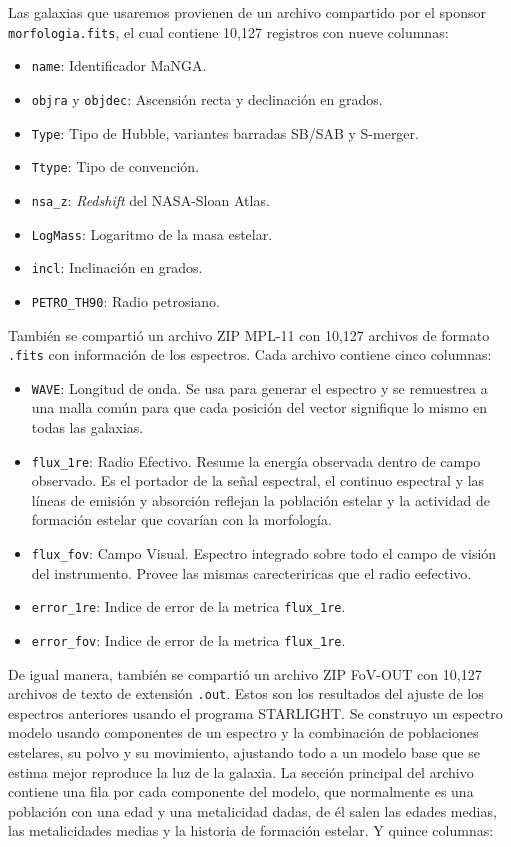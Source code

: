 \documentclass[12pt]{article}
\begin{document}
Las galaxias que usaremos provienen de un archivo compartido por el sponsor \texttt{morfologia.fits}, el cual contiene 10,127 registros con nueve columnas:

\begin{itemize}
    \item \texttt{name}: Identificador MaNGA.
    \item \texttt{objra} y \texttt{objdec}: Ascensión recta y declinación en grados.
    \item \texttt{Type}: Tipo de Hubble, variantes barradas SB/SAB y S-merger.
    \item \texttt{Ttype}: Tipo de convención.
    \item \texttt{nsa\_z}: \textit{Redshift} del NASA-Sloan Atlas.
    \item \texttt{LogMass}: Logaritmo de la masa estelar.
    \item \texttt{incl}: Inclinación en grados.
    \item \texttt{PETRO\_TH90}: Radio petrosiano.
\end{itemize}

También se compartió un archivo ZIP MPL-11 con 10,127 archivos de formato \texttt{.fits} con información de los espectros. Cada archivo contiene cinco columnas:

\begin{itemize}
    \item \texttt{WAVE}: Longitud de onda. Se usa para generar el espectro y se remuestrea a una malla común para que cada posición del vector signifique lo mismo en todas las galaxias.
    \item \texttt{flux\_1re}: Radio Efectivo. Resume la energía observada dentro de campo observado. Es el portador de la señal espectral, el continuo espectral y las líneas de emisión y absorción reflejan la población estelar y la actividad de formación estelar que covarían con la morfología.
    \item \texttt{flux\_fov}: Campo Visual. Espectro integrado sobre todo el campo de visión del instrumento. Provee las mismas carecteriricas que el radio eefectivo.
    \item \texttt{error\_1re}: Indice de error de la metrica \texttt{flux\_1re}.
    \item \texttt{error\_fov}: Indice de error de la metrica \texttt{flux\_1re}.
\end{itemize}

De igual manera, también se compartió un archivo ZIP FoV-OUT con 10,127 archivos de texto de extensión \texttt{.out}. Estos son los resultados del ajuste de los espectros anteriores usando el programa STARLIGHT. Se construyo un espectro modelo usando componentes de un espectro y la combinación de poblaciones estelares, su polvo y su movimiento, ajustando todo a un modelo base que se estima mejor reproduce la luz de la galaxia. La sección principal del archivo contiene una fila por cada componente del modelo, que normalmente es una población con una edad y una metalicidad dadas, de él salen las edades medias, las metalicidades medias y la historia de formación estelar. Y quince columnas:
\end{document}
